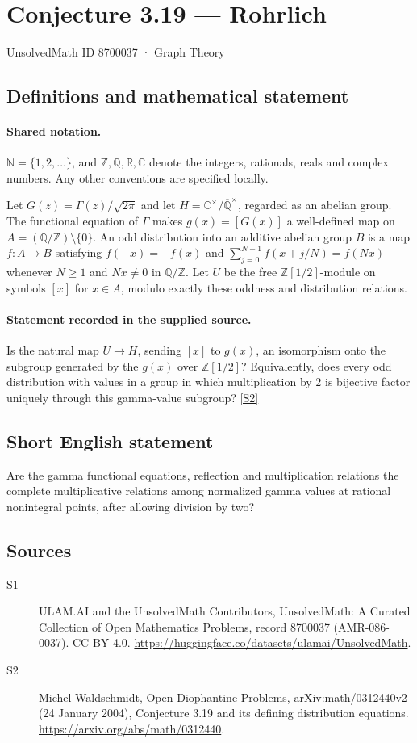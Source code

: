 \documentclass[11pt]{article}
\newcommand{\sref}[2]{\hyperlink{source:#1:#2}{[S#2]}}
\begin{document}
\setcounter{section}{8700036}
\section{Conjecture 3.19 — Rohrlich}\label{8700037}
{\small\sffamily UnsolvedMath ID 8700037 · Graph Theory}
\subsection{Definitions and mathematical statement}

\paragraph{Shared notation.}$\mathbb N=\{1,2,\ldots\}$, and $\mathbb Z,\mathbb Q,\mathbb R,\mathbb C$ denote the integers, rationals, reals and complex numbers. Any other conventions are specified locally.


Let $G(z)=\Gamma(z)/\sqrt{2\pi}$ and let $H=\mathbb C^\times/\overline{\mathbb Q}^{\times}$, regarded as an abelian group. The functional equation of $\Gamma$ makes $g(x)=[G(x)]$ a well-defined map on $A=(\mathbb Q/\mathbb Z)\setminus\{0\}$. An odd distribution into an additive abelian group $B$ is a map $f:A\to B$ satisfying $f(-x)=-f(x)$ and $\sum_{j=0}^{N-1}f(x+j/N)=f(Nx)$ whenever $N\ge1$ and $Nx\ne0$ in $\mathbb Q/\mathbb Z$. Let $U$ be the free $\mathbb Z[1/2]$-module on symbols $[x]$ for $x\in A$, modulo exactly these oddness and distribution relations.
\paragraph{Statement recorded in the supplied source.}
Is the natural map $U\to H$, sending $[x]$ to $g(x)$, an isomorphism onto the subgroup generated by the $g(x)$ over $\mathbb Z[1/2]$? Equivalently, does every odd distribution with values in a group in which multiplication by $2$ is bijective factor uniquely through this gamma-value subgroup? \sref{8700037}{2}
\subsection{Short English statement}
Are the gamma functional equations, reflection and multiplication relations the complete multiplicative relations among normalized gamma values at rational nonintegral points, after allowing division by two?
\subsection{Sources}
\begin{description}
\item[\hypertarget{source:8700037:1}{S1}] ULAM.AI and the UnsolvedMath Contributors, UnsolvedMath: A Curated Collection of Open Mathematics Problems, record 8700037 (AMR-086-0037). CC BY 4.0. \url{https://huggingface.co/datasets/ulamai/UnsolvedMath}.
\item[\hypertarget{source:8700037:2}{S2}] Michel Waldschmidt, Open Diophantine Problems, arXiv:math/0312440v2 (24 January 2004), Conjecture 3.19 and its defining distribution equations. \url{https://arxiv.org/abs/math/0312440}.
\end{description}
\label{end:8700037}
\end{document}
